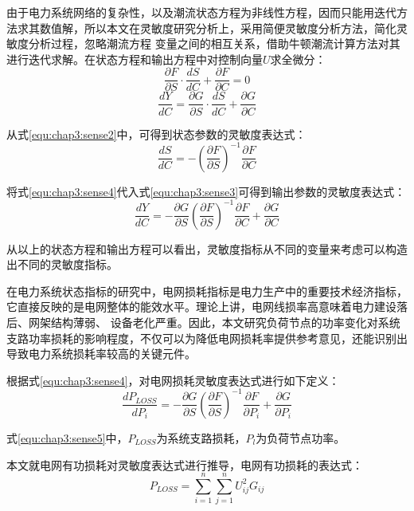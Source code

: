由于电力系统网络的复杂性，以及潮流状态方程为非线性方程，因而只能用迭代方法求其数值解，所以本文在灵敏度研究分析上，采用简便灵敏度分析方法，简化灵敏度分析过程，忽略潮流方程
变量之间的相互关系，借助牛顿潮流计算方法对其进行迭代求解。在状态方程和输出方程中对控制向量$U$求全微分：
\begin{equation}
  \label{equ:chap3:sense2}
  \frac{\partial F}{\partial S} \cdot \frac{d S}{d C}+\frac{\partial F}{\partial C}=0
  \end{equation}
\begin{equation}
  \label{equ:chap3:sense3}
  \frac{d Y}{d C}=\frac{\partial G}{\partial S} \cdot \frac{d S}{d C}+\frac{\partial G}{\partial C}
  \end{equation}

从式\ref{equ:chap3:sense2}中，可得到状态参数的灵敏度表达式：
\begin{equation}
  \label{equ:chap3:sense4}
  \frac{d S}{d C}=-\left(\frac{\partial F}{\partial S}\right)^{-1} \frac{\partial F}{\partial C}
  \end{equation}
  
将式\ref{equ:chap3:sense4}代入式\ref{equ:chap3:sense3}可得到输出参数的灵敏度表达式：
\begin{equation}
  \frac{d Y}{d C}=-\frac{\partial G}{\partial S}\left(\frac{\partial F}{\partial S}\right)^{-1} \frac{\partial F}{\partial C}+\frac{\partial G}{\partial C}
  \end{equation}

从以上的状态方程和输出方程可以看出，灵敏度指标从不同的变量来考虑可以构造出不同的灵敏度指标。

在电力系统状态指标的研究中，电网损耗指标是电力生产中的重要技术经济指标，它直接反映的是电网整体的能效水平。理论上讲，电网线损率高意味着电力建设落后、网架结构薄弱、
设备老化严重。因此，本文研究负荷节点的功率变化对系统支路功率损耗的影响程度，不仅可以为降低电网损耗率提供参考意见，还能识别出导致电力系统损耗率较高的关键元件。

根据式\ref{equ:chap3:sense4}，对电网损耗灵敏度表达式进行如下定义：
\begin{equation}
  \label{equ:chap3:sense5}
  \frac{d P_{LOSS}}{d P_i}=-\frac{\partial G}{\partial S}\left(\frac{\partial F}{\partial S}\right)^{-1} \frac{\partial F}{\partial P_i}+\frac{\partial G}{\partial P_i}
  \end{equation}

式\ref{equ:chap3:sense5}中，$P_{LOSS}$为系统支路损耗，$P_l$为负荷节点功率。

本文就电网有功损耗对灵敏度表达式进行推导，电网有功损耗的表达式：
\begin{equation}
  \label{equ:chap3:sense6}
  P_{L O S S}=\sum_{i=1}^{n} \sum_{j=1}^{n} U_{i j}^{2} G_{i j}
  \end{equation}

